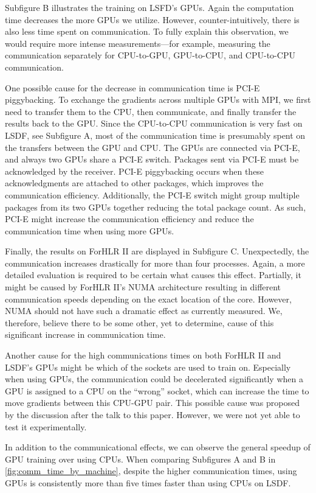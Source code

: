 \documentclass[conference,compsoc,a4paper]{IEEEtran}
\begin{document}
Subfigure B illustrates the training on LSFD's GPUs.
Again the computation time decreases the more GPUs we utilize.
However, counter-intuitively, there is also less time spent on communication.
%
To fully explain this observation, we would require more intense measurements---for example, measuring the communication separately for CPU-to-GPU, GPU-to-CPU, and CPU-to-CPU communication.

One possible cause for the decrease in communication time is PCI-E piggybacking.
To exchange the gradients across multiple GPUs with MPI, we first need to transfer them to the CPU, then communicate, and finally transfer the results back to the GPU.
Since the CPU-to-CPU communication is very fast on LSDF, see Subfigure A, most of the communication time is presumably spent on the transfers between the GPU and CPU.
%
The GPUs are connected via PCI-E, and always two GPUs share a PCI-E switch.
Packages sent via PCI-E must be acknowledged by the receiver.
PCI-E piggybacking occurs when these acknowledgments are attached to other packages, which improves the communication efficiency.
Additionally, the PCI-E switch might group multiple packages from its two GPUs together reducing the total package count.
As such, PCI-E might increase the communication efficiency and reduce the communication time when using more GPUs.

Finally, the results on ForHLR II are displayed in Subfigure C.
Unexpectedly, the communication increases drastically for more than four processes.
Again, a more detailed evaluation is required to be certain what causes this effect.
Partially, it might be caused by ForHLR II's NUMA architecture resulting in different communication speeds depending on the exact location of the core.
However, NUMA should not have such a dramatic effect as currently measured.
We, therefore, believe there to be some other, yet to determine, cause of this significant increase in communication time.

Another cause for the high communications times on both ForHLR II and LSDF's GPUs might be which of the sockets are used to train on.
Especially when using GPUs, the communication could be decelerated significantly when a GPU is assigned to a CPU on the ``wrong'' socket, which can increase the time to move gradients between this CPU-GPU pair.
This possible cause was proposed by the discussion after the talk to this paper.
However, we were not yet able to test it experimentally.

In addition to the communicational effects, we can observe the general speedup of GPU training over using CPUs.
When comparing Subfigures A and B in \autoref{fig:comm_time_by_machine}, despite the higher communication times, using GPUs is consistently more than five times faster than using CPUs on LSDF.
\end{document}
